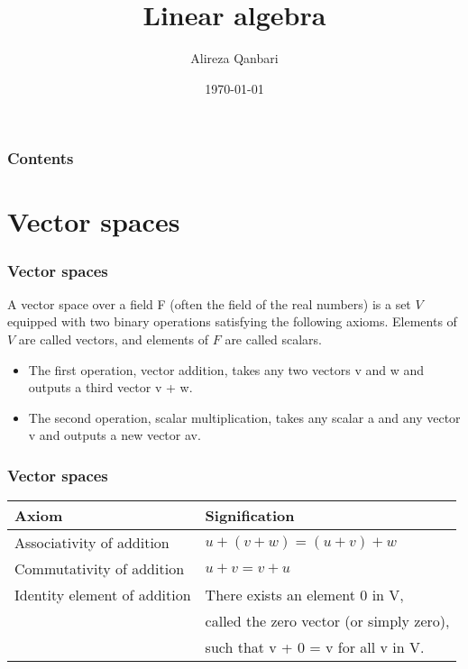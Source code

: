 \documentclass{beamer}
\title{Linear algebra}
\author{Alireza Qanbari}
\date{\today}
\begin{document}
    \frame{\titlepage}




    \begin{frame}
        \frametitle{Contents}
        \tableofcontents[pausesections]
    \end{frame}


    \section{Vector spaces}

    \begin{frame}
        \frametitle{Vector spaces}
        A vector space over a field F (often the field of the real numbers) is a set $V$ equipped with two binary operations
        satisfying the following axioms. Elements of $V$ are called vectors, and elements of $F$ are called scalars.\cite{2}
        \begin{itemize}


            \item<1->The first operation, vector addition, takes any two vectors v and w and outputs a third vector v + w.
            \item <2->The second operation, scalar multiplication, takes any scalar a and any vector v and outputs a new vector av.

        \end{itemize}
    \end{frame}

    \begin{frame}
        \frametitle{Vector spaces}
        \begin{center}

            \begin{tabular}{||l | l||}
                \hline
                Axiom & Signification \\
                \hline
                Associativity of addition &  $u+(v+w)=(u+v)+w$  \\
                \hline
                Commutativity of addition & $u+v=v+u$ \\
                \hline
                Identity element of addition & There exists an element 0 in V,\\
                &called the zero vector (or simply zero),\\
                & such that v + 0 = v for all v in V. \\
                \hline


            \end{tabular}
        \end{center}


    \end{frame}
\end{document}
